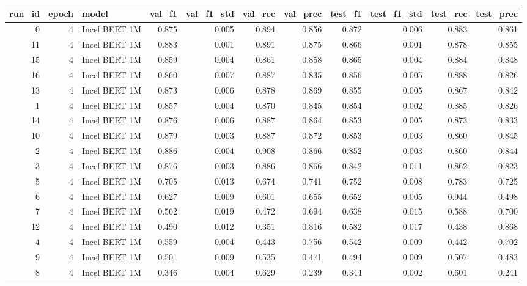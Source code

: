 \begin{tabular}{rrlrrrrrrrr}
\toprule
 run\_id &  epoch &         model &  val\_f1 &  val\_f1\_std &  val\_rec &  val\_prec &  test\_f1 &  test\_f1\_std &  test\_rec &  test\_prec \\
\midrule
      0 &      4 & Incel BERT 1M &   0.875 &       0.005 &    0.894 &     0.856 &    0.872 &        0.006 &     0.883 &      0.861 \\
     11 &      4 & Incel BERT 1M &   0.883 &       0.001 &    0.891 &     0.875 &    0.866 &        0.001 &     0.878 &      0.855 \\
     15 &      4 & Incel BERT 1M &   0.859 &       0.004 &    0.861 &     0.858 &    0.865 &        0.004 &     0.884 &      0.848 \\
     16 &      4 & Incel BERT 1M &   0.860 &       0.007 &    0.887 &     0.835 &    0.856 &        0.005 &     0.888 &      0.826 \\
     13 &      4 & Incel BERT 1M &   0.873 &       0.006 &    0.878 &     0.869 &    0.855 &        0.005 &     0.867 &      0.842 \\
      1 &      4 & Incel BERT 1M &   0.857 &       0.004 &    0.870 &     0.845 &    0.854 &        0.002 &     0.885 &      0.826 \\
     14 &      4 & Incel BERT 1M &   0.876 &       0.006 &    0.887 &     0.864 &    0.853 &        0.005 &     0.873 &      0.833 \\
     10 &      4 & Incel BERT 1M &   0.879 &       0.003 &    0.887 &     0.872 &    0.853 &        0.003 &     0.860 &      0.845 \\
      2 &      4 & Incel BERT 1M &   0.886 &       0.004 &    0.908 &     0.866 &    0.852 &        0.003 &     0.860 &      0.844 \\
      3 &      4 & Incel BERT 1M &   0.876 &       0.003 &    0.886 &     0.866 &    0.842 &        0.011 &     0.862 &      0.823 \\
      5 &      4 & Incel BERT 1M &   0.705 &       0.013 &    0.674 &     0.741 &    0.752 &        0.008 &     0.783 &      0.725 \\
      6 &      4 & Incel BERT 1M &   0.627 &       0.009 &    0.601 &     0.655 &    0.652 &        0.005 &     0.944 &      0.498 \\
      7 &      4 & Incel BERT 1M &   0.562 &       0.019 &    0.472 &     0.694 &    0.638 &        0.015 &     0.588 &      0.700 \\
     12 &      4 & Incel BERT 1M &   0.490 &       0.012 &    0.351 &     0.816 &    0.582 &        0.017 &     0.438 &      0.868 \\
      4 &      4 & Incel BERT 1M &   0.559 &       0.004 &    0.443 &     0.756 &    0.542 &        0.009 &     0.442 &      0.702 \\
      9 &      4 & Incel BERT 1M &   0.501 &       0.009 &    0.535 &     0.471 &    0.494 &        0.009 &     0.507 &      0.483 \\
      8 &      4 & Incel BERT 1M &   0.346 &       0.004 &    0.629 &     0.239 &    0.344 &        0.002 &     0.601 &      0.241 \\
\bottomrule
\end{tabular}

